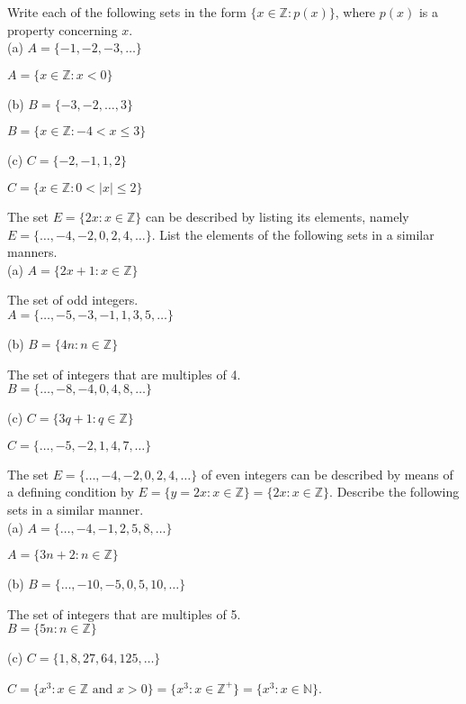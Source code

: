 \documentclass[12pt]{article}
\newcommand{\Z}{\mathbb{Z}}
\newenvironment{problem}[2][Problem]{\begin{trivlist}
		\item[\hskip \labelsep {\bfseries #1}\hskip \labelsep {\bfseries #2.}]}{\end{trivlist}}
\newenvironment{solution}[2][Solution]{\begin{trivlist}
		\item[\hskip \labelsep {\bfseries #1}\hskip \labelsep {\bfseries #2.}]}{\end{trivlist}}
\begin{document}
	\begin{problem}{5}
		Write each of the following sets in the form $\{x \in \Z:p(x)\}$, where $p(x)$ is a property concerning $x$.\\
		
		(a) $A=\{-1,-2,-3,\ldots\}$
		\begin{solution}{a}
			$A=\{x\in \Z:x<0\}$
		\end{solution} 
		(b) $B=\{-3,-2,\ldots,3\}$
		\begin{solution}{b}
			$B=\{x\in \Z: -4<x\leq 3\}$
		\end{solution}
		(c) $C=\{-2,-1,1,2\}$
		\begin{solution}{c}
			$C=\{x\in \Z:0<|x|\leq 2\}$
		\end{solution}
	\end{problem}

	\begin{problem}{6}
		The set $E=\{2x:x\in \Z\}$ can be described by listing its elements, namely $E=\{\ldots,-4,-2,0,2,4,\ldots\}$. List the elements of the following sets in a similar manners.\\
		
		(a) $A=\{2x+1:x\in \Z\}$
		\begin{solution}{a} 
			The set of odd integers.\\
			$A=\{\ldots,-5,-3,-1,1,3,5,\ldots\}$
		\end{solution}
		(b) $B=\{4n:n\in \Z\}$
		\begin{solution}{b}
			The set of integers that are multiples of 4.\\
			$B=\{\ldots,-8,-4,0,4,8,\ldots\}$
		\end{solution}
		(c) $C=\{3q+1:q\in \Z\}$
		\begin{solution}{c}
			$C=\{\ldots,-5,-2,1,4,7,\ldots\}$
		\end{solution}
	\end{problem}

	\begin{problem}{7}
		The set $E=\{\ldots,-4,-2,0,2,4,\ldots\}$ of even integers can be described by means of a defining condition by $E=\{y=2x:x\in \Z\} = \{2x:x\in \Z\}$. Describe the following sets in a similar manner.\\
		
		(a) $A=\{\ldots,-4,-1,2,5,8,\ldots\}$
		\begin{solution}{a}
			$A=\{3n+2:n\in \Z\}$
		\end{solution} 
		(b) $B=\{\ldots,-10,-5,0,5,10,\ldots\}$
		\begin{solution}{b}
			The set of integers that are multiples of 5.\\
			$B=\{5n:n\in \Z\}$
		\end{solution}
		(c) $C=\{1,8,27,64,125,\ldots\}$
		\begin{solution}{c}
			$C=\{x^{3}:x\in \Z \text{ and } x>0\} = \{x^{3}:x\in \Z^{+}\}=\{x^{3}:x\in \mathbb{N}\}$.
		
		\end{solution}
	\end{problem}
\end{document}
